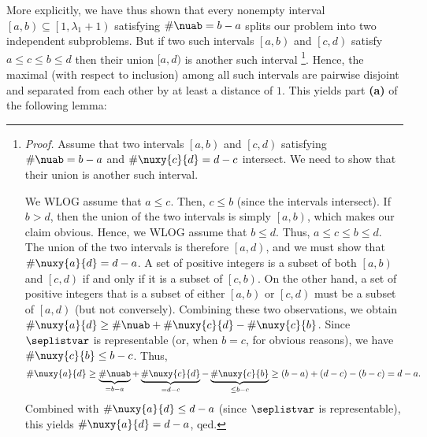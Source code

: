 \documentclass[numbers=enddot,12pt,final,onecolumn,notitlepage]{scrartcl}%
\theoremstyle{definition}
\begin{document}
More explicitly, we have thus shown that every nonempty interval $\left[a,b\right) \subseteq \left[1, \lambda_1+1\right)$ satisfying $\#\nuab = b-a$ splits our problem into two independent subproblems. But if two such intervals $\left[a,b\right)$ and $\left[c,d\right)$ satisfy $a\leq c\leq b\leq d$ then their union $[a,d)$ is another such interval %
\footnote{\textit{Proof.} Assume that two intervals $\left[a,b\right)$ and $\left[c,d\right)$ satisfying $\#\nuab = b-a$ and $\#\nuxy{c}{d} = d-c$ intersect. We need to show that their union is another such interval.
\par We WLOG assume that $a \leq c$. Then, $c \leq b$ (since the intervals intersect). If $b > d$, then the union of the two intervals is simply $\left[a,b\right)$, which makes our claim obvious. Hence, we WLOG assume that $b \leq d$. Thus, $a \leq c \leq b \leq d$. The union of the two intervals is therefore $\left[a, d\right)$, and we must show that $\#\nuxy{a}{d} = d-a$.
A set of positive integers is a subset of both $\left[a, b\right)$ and $\left[c, d\right)$ if and only if it is a subset of $\left[c, b\right)$. On the other hand, a set of positive integers that is a subset of either $\left[a, b\right)$ or $\left[c, d\right)$ must be a subset of $\left[a, d\right)$ (but not conversely). Combining these two observations, we obtain $\#\nuxy{a}{d} \geq \#\nuab + \#\nuxy{c}{d} - \#\nuxy{c}{b}$. Since $\seplistvar$ is representable (or, when $b=c$, for obvious reasons), we have $\#\nuxy{c}{b} \leq b-c$. Thus,
\[
\#\nuxy{a}{d} \geq \underbrace{\#\nuab}_{=b-a} + \underbrace{\#\nuxy{c}{d}}_{=d-c} - \underbrace{\#\nuxy{c}{b}}_{\leq b-c} \geq \left(b-a\right) + \left(d-c\right) - \left(b-c\right) = d-a.
\]
Combined with $\#\nuxy{a}{d} \leq d-a$ (since $\seplistvar$ is representable), this yields $\#\nuxy{a}{d} = d-a$, qed.}.
Hence, the maximal (with respect to inclusion) among all such intervals are pairwise disjoint and separated from each other by at least a distance of $1$.
This yields part \textbf{(a)} of the following lemma:
\end{document}

